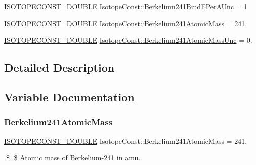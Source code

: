 \begin{DoxyCompactItemize}
\mbox{\hyperlink{group___isotope_const-_macros_ga8f45a7272ce02c0b4c65c44636ed719a}{I\+S\+O\+T\+O\+P\+E\+C\+O\+N\+S\+T\+\_\+\+D\+O\+U\+B\+LE}} \mbox{\hyperlink{group___isotope_const-_berkelium-_bk241_gafb0c303f5ce957c4f72f61ac0eb308fb}{Isotope\+Const\+::\+Berkelium241\+Bind\+E\+Per\+A\+Unc}} = 1
\item 
\mbox{\hyperlink{group___isotope_const-_macros_ga8f45a7272ce02c0b4c65c44636ed719a}{I\+S\+O\+T\+O\+P\+E\+C\+O\+N\+S\+T\+\_\+\+D\+O\+U\+B\+LE}} \mbox{\hyperlink{group___isotope_const-_berkelium-_bk241_gadba424ae6d915eece4129219622186a2}{Isotope\+Const\+::\+Berkelium241\+Atomic\+Mass}} = 241.
\item 
\mbox{\hyperlink{group___isotope_const-_macros_ga8f45a7272ce02c0b4c65c44636ed719a}{I\+S\+O\+T\+O\+P\+E\+C\+O\+N\+S\+T\+\_\+\+D\+O\+U\+B\+LE}} \mbox{\hyperlink{group___isotope_const-_berkelium-_bk241_ga56d2f29098aa20f59a9a6babfbaad114}{Isotope\+Const\+::\+Berkelium241\+Atomic\+Mass\+Unc}} = 0.
\end{DoxyCompactItemize}


\subsection{Detailed Description}


\subsection{Variable Documentation}
\mbox{\label{group___isotope_const-_berkelium-_bk241_gadba424ae6d915eece4129219622186a2}} 
\subsubsection{\texorpdfstring{Berkelium241\+Atomic\+Mass}{Berkelium241AtomicMass}}
{\footnotesize\ttfamily \mbox{\hyperlink{group___isotope_const-_macros_ga8f45a7272ce02c0b4c65c44636ed719a}{I\+S\+O\+T\+O\+P\+E\+C\+O\+N\+S\+T\+\_\+\+D\+O\+U\+B\+LE}} Isotope\+Const\+::\+Berkelium241\+Atomic\+Mass = 241.}

\$ \$ Atomic mass of Berkelium-\/241 in amu. \mbox{\label{group___isotope_const-_berkelium-_bk241_ga56d2f29098aa20f59a9a6babfbaad114}} 
